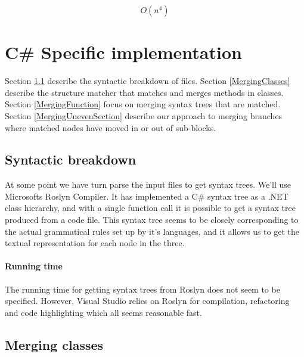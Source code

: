 \documentclass[11pt]{article}
\begin{document}
\begin{equation}
O(n^4) \nonumber
\end{equation}

\section{C\# Specific implementation}
Section \ref{SyntaxBreakDown} describe the syntactic breakdown of files. Section \ref{MergingClasses} describe the structure matcher that matches and merges methods in classes. Section \ref{MergingFunction} focus on merging syntax trees that are matched. Section \ref{MergingUnevenSection} describe our approach to merging branches where matched nodes have moved in or out of sub-blocks.

\subsection{Syntactic breakdown}
\label{SyntaxBreakDown}
At some point we have turn parse the input files to get syntax trees. We'll use Microsofts Roslyn Compiler. It has implemented a C\# syntax tree as a .NET class hierarchy, and with a single function call it is possible to get a syntax tree produced from a code file. This syntax tree seems to be closely corresponding to the actual grammatical rules set up by it's languages, and it allows us to get the textual representation for each node in the three.

\paragraph{Running time} The running time for getting syntax trees from Roslyn does not seem to be specified. However, Visual Studio relies on Roslyn for compilation, refactoring and code highlighting which all seems reasonable fast.



\subsection{Merging classes}
\label{mergingclasses}
\label{MergingClasses}
\end{document}
